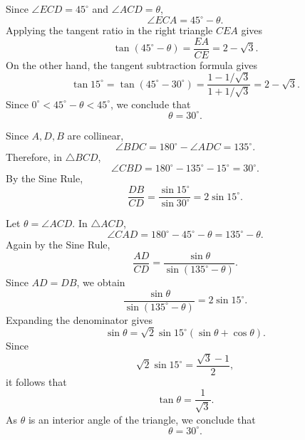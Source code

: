 \begin{solutions}
\begin{solution}
            Since $\angle ECD=45^\circ$ and $\angle ACD=\theta$,
            \[
                \angle ECA=45^\circ-\theta.
            \]
            Applying the tangent ratio in the right triangle $CEA$ gives
            \[
                \tan(45^\circ-\theta)
                =
                \frac{EA}{CE}
                =
                2-\sqrt{3}.
            \]
            On the other hand, the tangent subtraction formula gives
            \[
                \tan 15^\circ
                =
                \tan(45^\circ-30^\circ)
                =
                \frac{1-1/\sqrt{3}}{1+1/\sqrt{3}}
                =
                2-\sqrt{3}.
            \]
            Since $0^\circ<45^\circ-\theta<45^\circ$, we conclude that
            \[
                \boxed{\theta=30^\circ}.
            \]
        \end{solution}

        \begin{solution}
        Since $A,D,B$ are collinear,
        \[
            \angle BDC
            =
            180^\circ-\angle ADC
            =
            135^\circ.
        \]
        Therefore, in $\triangle BCD$,
        \[
            \angle CBD
            =
            180^\circ-135^\circ-15^\circ
            =
            30^\circ.
        \]
        By the Sine Rule,
        \[
            \frac{DB}{CD}
            =
            \frac{\sin 15^\circ}{\sin 30^\circ}
            =
            2\sin 15^\circ.
        \]

        Let $\theta=\angle ACD$. In $\triangle ACD$,
        \[
            \angle CAD
            =
            180^\circ-45^\circ-\theta
            =
            135^\circ-\theta.
        \]
        Again by the Sine Rule,
        \[
            \frac{AD}{CD}
            =
            \frac{\sin\theta}{\sin(135^\circ-\theta)}.
        \]
        Since $AD=DB$, we obtain
        \[
            \frac{\sin\theta}{\sin(135^\circ-\theta)}
            =
            2\sin 15^\circ.
        \]
        Expanding the denominator gives
        \[
            \sin\theta
            =
            \sqrt{2}\sin 15^\circ
            (\sin\theta+\cos\theta).
        \]
        Since
        \[
            \sqrt{2}\sin 15^\circ
            =
            \frac{\sqrt{3}-1}{2},
        \]
        it follows that
        \[
            \tan\theta
            =
            \frac{1}{\sqrt{3}}.
        \]
        As $\theta$ is an interior angle of the triangle, we conclude that
        \[
            \boxed{\theta=30^\circ}.
        \]
        \end{solution}
    \end{solutions}

